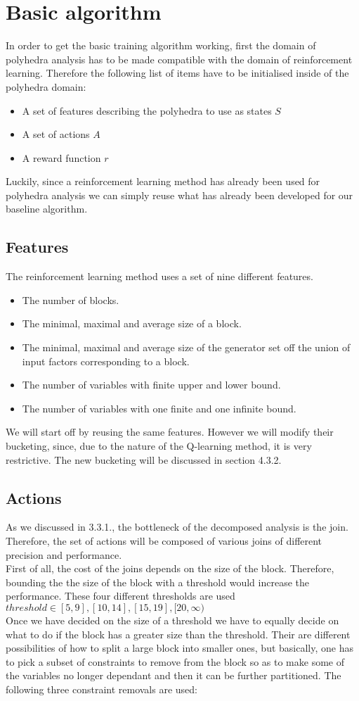 \section{Basic algorithm}
In order to get the basic training algorithm working, first the domain of polyhedra analysis has to be made compatible with the domain of reinforcement learning. Therefore the following list of items have to be initialised inside of the polyhedra domain:
\begin{itemize}
	\item A set of features describing the polyhedra to use as states $S$
	\item A set of actions $A$
	\item A reward function $r$
\end{itemize}
Luckily, since a reinforcement learning method \cite{singh2018fast} has already been used for polyhedra analysis we can simply reuse what has already been developed for our baseline algorithm.\\
\subsection{Features}
The reinforcement learning method uses a set of nine different features.
\begin{itemize}
	\item The number of blocks.
	\item The minimal, maximal and average size of a block.
	\item The minimal, maximal and average size of the generator set off the union of input factors corresponding to a block.
	\item The number of variables with finite upper and lower bound.
	\item The number of variables with one finite and one infinite bound.
\end{itemize}
We will start off by reusing the same features. However we will modify their bucketing, since, due to the nature of the Q-learning method, it is very restrictive. The new bucketing will be discussed in section 4.3.2.

\subsection{Actions}
As we discussed in 3.3.1., the bottleneck of the decomposed analysis is the join. Therefore, the set of actions will be composed of various joins of different precision and performance.\\
First of all, the cost of the joins depends on the size of the block. Therefore, bounding the the size of the block with a threshold would increase the performance. These four different thresholds are used $threshold \in [5,9],[10,14],[15,19],[20,\infty)$\\
Once we have decided on the size of a threshold we have to equally decide on what to do if the block has a greater size than the threshold. Their are different possibilities of how to split a large block into smaller ones, but basically, one has to pick a subset of constraints to remove from the block so as to make some of the variables no longer dependant and then it can be further partitioned. The following three constraint removals are used:
